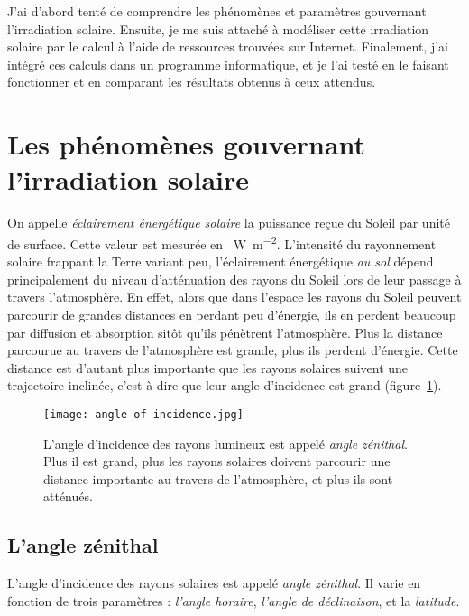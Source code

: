\documentclass[12pt]{article}
\begin{document}
\vspace{0.5cm}

J'ai d'abord tenté de comprendre les phénomènes et paramètres gouvernant l'irradiation solaire.
Ensuite, je me suis attaché à modéliser cette irradiation solaire par le calcul à l'aide de ressources trouvées sur Internet.
Finalement, j'ai intégré ces calculs dans un programme informatique, et je l'ai testé en le faisant fonctionner et en comparant les résultats obtenus à ceux attendus.



\clearpage
\section{Les phénomènes gouvernant l'irradiation solaire}

On appelle \emph{éclairement énergétique solaire} la puissance reçue du Soleil par unité de surface.
Cette valeur est mesurée en \SI{}{\watt\per\square\meter}.
L'intensité du rayonnement solaire frappant la Terre variant peu, l'éclairement énergétique \emph{au sol} dépend principalement du niveau d'atténuation des rayons du Soleil lors de leur passage à travers l'atmosphère.
En effet, alors que dans l'espace les rayons du Soleil peuvent parcourir de grandes distances en perdant peu d'énergie, ils en perdent beaucoup par diffusion et absorption sitôt qu'ils pénètrent l'atmosphère.
Plus la distance parcourue au travers de l'atmosphère est grande, plus ils perdent d'énergie.
Cette distance est d'autant plus importante que les rayons solaires suivent une trajectoire inclinée, c'est-à-dire que leur angle d'incidence est grand (figure~\ref{fig:angle-of-incidence}).

 \begin{figure}[H]
	\centerline{\texttt{[image: angle-of-incidence.jpg]}}
	\caption{L'angle d'incidence des rayons lumineux est appelé \emph{angle zénithal}. Plus il est grand, plus les rayons solaires doivent parcourir une distance importante au travers de l'atmosphère, et plus ils sont atténués.}
	\label{fig:angle-of-incidence}
\end{figure}

\subsection{L'angle zénithal}
L'angle d'incidence des rayons solaires est appelé \emph{angle zénithal}.
Il varie en fonction de trois paramètres : \emph{l'angle horaire}, \emph{l'angle de déclinaison}, et la \emph{latitude}.
\end{document}
